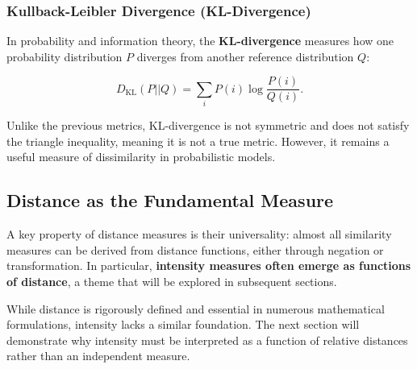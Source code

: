 \subsubsection{Kullback-Leibler Divergence (KL-Divergence)}
In probability and information theory, the \textbf{KL-divergence} measures how one probability distribution \( P \) diverges from another reference distribution \( Q \):

\[
D_{\text{KL}}(P || Q) = \sum_i P(i) \log \frac{P(i)}{Q(i)}.
\]

Unlike the previous metrics, KL-divergence is not symmetric and does not satisfy the triangle inequality, meaning it is not a true metric. However, it remains a useful measure of dissimilarity in probabilistic models.

\subsection{Distance as the Fundamental Measure}

A key property of distance measures is their universality: almost all similarity measures can be derived from distance functions, either through negation or transformation. In particular, \textbf{intensity measures often emerge as functions of distance}, a theme that will be explored in subsequent sections.

While distance is rigorously defined and essential in numerous mathematical formulations, intensity lacks a similar foundation. The next section will demonstrate why intensity must be interpreted as a function of relative distances rather than an independent measure.

